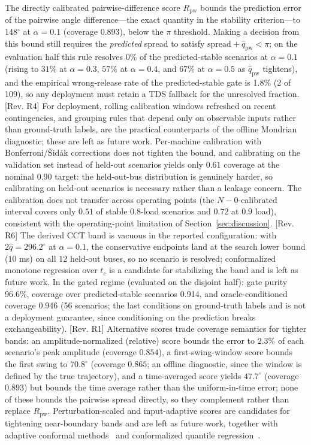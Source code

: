 \documentclass[5p,times]{elsarticle}
\newcommand{\pairq}{148}              %
\newcommand{\paircov}{0.893}          %
\newcommand{\decfrac}{0\%}            %
\newcommand{\wrrate}{1.8\%}           %
\newcommand{\wrnum}{2}                %
\newcommand{\wrdem}{109}              %
\newcommand{\gatepurity}{96.6\%}      %
\newcommand{\gatecovAll}{0.914}       %
\newcommand{\gatecovTS}{0.946}        %
\newcommand{\gatenum}{56}             %
\begin{document}
The directly calibrated pairwise-difference score $R_{\mathrm{pw}}$ bounds the prediction error of the pairwise angle
difference---the exact quantity in the stability criterion---to \pairq{}$^\circ$ at
$\alpha{=}0.1$ (coverage \paircov{}), below the $\pi$ threshold. Making a decision from this
bound still requires the \emph{predicted} spread to satisfy
$\mathrm{spread} + \hat q_{\mathrm{pw}} < \pi$; on the evaluation half this rule resolves
\decfrac{} of the predicted-stable scenarios at $\alpha{=}0.1$ (rising to $31\%$ at
$\alpha{=}0.3$, $57\%$ at $\alpha{=}0.4$, and $67\%$ at $\alpha{=}0.5$ as $\hat q_{\mathrm{pw}}$
tightens), and the empirical wrong-release rate of the predicted-stable gate is \wrrate{}
($\wrnum{}$ of \wrdem{}), so any deployment must retain a TDS fallback for the unresolved
fraction. [Rev. R4] For deployment, rolling calibration windows refreshed on recent contingencies, and
grouping rules that depend only on observable inputs rather than ground-truth labels, are the
practical counterparts of the offline Mondrian diagnostic; these are left as future work.
Per-machine calibration with Bonferroni/\v{S}id\'ak corrections does not tighten the
bound, and calibrating on the validation set instead of held-out scenarios
yields only $0.61$ coverage at the nominal $0.90$ target: the held-out-bus distribution is
genuinely harder, so calibrating on held-out scenarios is necessary rather than a leakage
concern. The calibration does not transfer across operating points (the $N{-}0$-calibrated interval covers only $0.51$ of
stable $0.8$-load scenarios and $0.72$ at $0.9$ load), consistent with the operating-point
limitation of Section~\ref{sec:discussion}. [Rev. R6] The derived CCT band is vacuous in the reported configuration: with
$2\hat q = 296.2^\circ$ at $\alpha{=}0.1$, the conservative endpoints land at the search lower
bound ($10$ ms) on all $12$ held-out buses, so no scenario is resolved; conformalized monotone
regression over $t_c$ is a candidate for stabilizing the band and is left as future work.
In the gated regime (evaluated on the disjoint half): gate purity \gatepurity{}, coverage
over predicted-stable scenarios \gatecovAll{}, and oracle-conditioned coverage \gatecovTS{}
(\gatenum{} scenarios; the last conditions on ground-truth labels and is not a deployment
guarantee, since conditioning on the prediction breaks exchangeability). [Rev. R1] Alternative scores trade coverage semantics for tighter bands: an
amplitude-normalized (relative) score bounds the error to $2.3\%$ of each scenario's peak
amplitude (coverage $0.854$), a first-swing-window score bounds the first swing to
$70.8^\circ$ (coverage $0.865$; an offline diagnostic, since the window is defined by the true
trajectory), and a time-averaged score yields $47.7^\circ$ (coverage $0.893$) but bounds the
time average rather than the uniform-in-time error; none of these bounds the pairwise spread
directly, so they complement rather than replace $R_{\mathrm{pw}}$. Perturbation-scaled and
input-adaptive scores are candidates for tightening near-boundary bands and are left as future
work, together with adaptive conformal
methods~\cite{gibbs2021adaptive, lei2014distribution} and conformalized quantile
regression~\cite{romano2019conformalized}.
\end{document}
